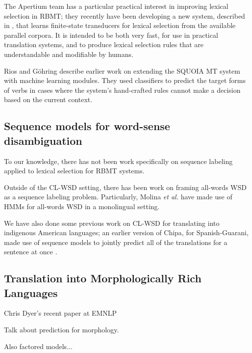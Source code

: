 The Apertium team has a particular practical interest in improving lexical
selection in RBMT; they recently have been developing
a new system, described in \cite{tyers-fst}, that learns finite-state
transducers for lexical selection from the available parallel corpora. It is
intended to be both very fast, for use in practical translation systems, and
to produce lexical selection rules that are understandable and modifiable by
humans.

Rios and G\"{o}hring \cite{riosgonzales-gohring:2013:HyTra} describe
earlier work on extending the SQUOIA MT system with machine learning modules.
They used classifiers to predict the target forms of verbs in cases where the
system's hand-crafted rules cannot make a decision based on the current
context.

\subsection{Sequence models for word-sense disambiguation}
To our knowledge, there has not been work specifically on sequence labeling
applied to lexical selection for RBMT systems.

Outside of the CL-WSD setting, there has been work on framing all-words WSD as
a sequence labeling problem. Particularly, Molina \textit{et al.}
\cite{DBLP:conf/iberamia/MolinaPS02} have made use of HMMs for all-words
WSD in a monolingual setting.

We have also done some previous work on CL-WSD for translating into indigenous
American languages; an earlier version of Chipa, for Spanish-Guarani, made use
of sequence models to jointly predict all of the translations for a sentence at
once \cite{rudnick-gasser:2013:HyTra}.



\subsection{Translation into Morphologically Rich Languages}
Chris Dyer's recent paper at EMNLP
\cite{chahuneau:2013:emnlp}

Talk about prediction for morphology.
\cite{toutanova-suzuki-ruopp:2008:ACLMain}

Also factored models...
\cite{yeniterzi-oflazer:2010:ACL}
